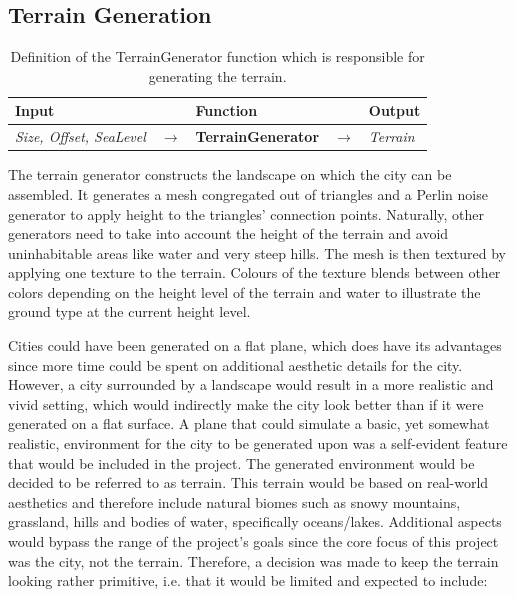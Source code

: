 \subsection{Terrain Generation}

\begin{table}[H]
 \centering
 \begin{tabular}{lllll}
  \textbf{Input} & & \textbf{Function} & & \textbf{Output} \\
  \midrule
  \textit{Size, Offset, SeaLevel} & $\rightarrow$ & \textbf{TerrainGenerator} & $\rightarrow$ & \textit{Terrain} \\
  \bottomrule
 \end{tabular}

 \caption{Definition of the TerrainGenerator function which is responsible for generating the terrain.}
 \label{table:terrgen}
 \end{table}
\vspace{-0.4cm} %


The terrain generator constructs the landscape on which the city can be assembled.
It generates a mesh congregated out of triangles and a Perlin noise generator to apply height to the triangles' connection points.
Naturally, other generators need to take into account the height of the terrain and avoid uninhabitable areas like water and very steep hills.
The mesh is then textured by applying one texture to the terrain.
Colours of the texture blends between other colors depending on the height level of the terrain and water to illustrate the ground type at the current height level.

Cities could have been generated on a flat plane, which does have its advantages since more time could be spent on additional aesthetic details for the city.
However, a city surrounded by a landscape would result in a more realistic and vivid setting, which would indirectly make the city look better than if it were generated on a flat surface.
A plane that could simulate a basic, yet somewhat realistic, environment for the city to be generated upon was a self-evident feature that would be included in the project.
The generated environment would be decided to be referred to as terrain.
This terrain would be based on real-world aesthetics and therefore include natural biomes such as snowy mountains, grassland, hills and bodies of water, specifically oceans/lakes.
Additional aspects would bypass the range of the project's goals since the core focus of this project was the city, not the terrain.
Therefore, a decision was made to keep the terrain looking rather primitive, i.e. that it would be limited and expected to include: 

